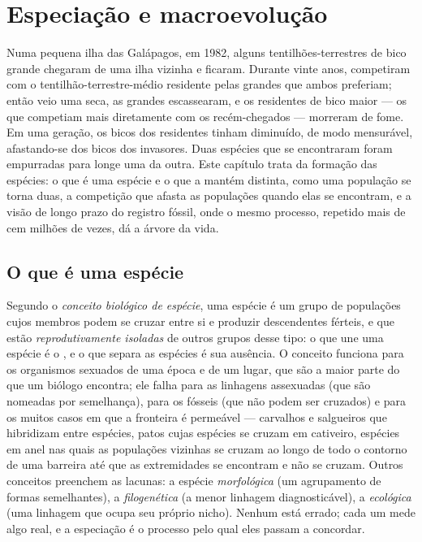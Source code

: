 \chapter{Especiação e macroevolução}\label{ch:b2:speciation}

Numa pequena ilha das Galápagos, em 1982, alguns tentilhões-terrestres
de bico grande chegaram de uma ilha vizinha e ficaram. Durante vinte
anos, competiram com o tentilhão-terrestre-médio residente pelas
 grandes que ambos preferiam; então veio uma seca, as 
grandes escassearam, e os residentes de bico maior --- os que competiam
mais diretamente com os recém-chegados --- morreram de fome. Em uma
geração, os bicos dos residentes tinham diminuído, de modo mensurável,
afastando-se dos bicos dos invasores. Duas espécies que se encontraram
foram empurradas para longe uma da outra. Este capítulo trata da
formação das espécies: o que é uma espécie e o que a mantém distinta,
como uma população se torna duas, a competição que afasta as populações
quando elas se encontram, e a visão de longo prazo do registro fóssil,
onde o mesmo processo, repetido mais de cem milhões de vezes, dá a
árvore da vida.

\section{O que é uma espécie}

\begin{definition}[Espécie]\label{def:b2:speciation:species}
Segundo o \emph{conceito biológico de espécie}, uma espécie é um grupo
de populações cujos membros podem se cruzar entre si e produzir
descendentes férteis, e que estão \emph{reprodutivamente isoladas} de
outros grupos desse tipo: o que une uma espécie é o , e o
que separa as espécies é sua ausência. O conceito funciona para os
organismos sexuados de uma época e de um lugar, que são a maior parte do
que um biólogo encontra; ele falha para as linhagens assexuadas (que são
nomeadas por semelhança), para os fósseis (que não podem ser cruzados) e
para os muitos casos em que a fronteira é permeável --- carvalhos e
salgueiros que hibridizam entre espécies, patos cujas espécies se cruzam
em cativeiro, espécies em anel nas quais as populações vizinhas se cruzam
ao longo de todo o contorno de uma barreira até que as extremidades se
encontram e não se cruzam. Outros conceitos preenchem as lacunas: a
espécie \emph{morfológica} (um agrupamento de formas semelhantes), a
\emph{filogenética} (a menor linhagem diagnosticável), a
\emph{ecológica} (uma linhagem que ocupa seu próprio nicho). Nenhum está
errado; cada um mede algo real, e a especiação é o processo pelo qual
eles passam a concordar.
\end{definition}

